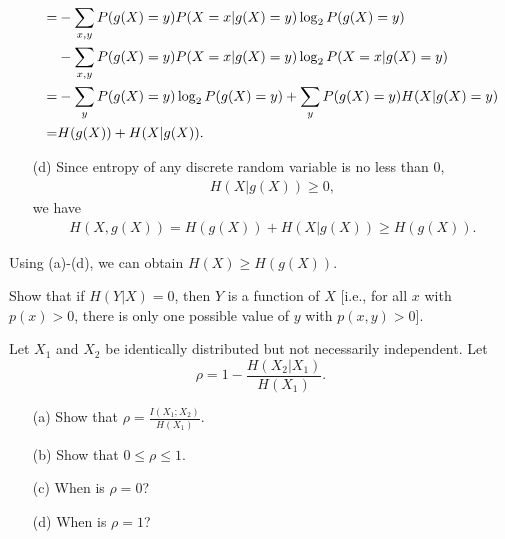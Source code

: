\documentclass{assignment}
\begin{document}
\begin{pf}
\begin{itemize}
\begin{align}
            \notag=&-\sum_{x,y}P(g(X)=y)P(X=x\vert g(X)=y)\log_2P(g(X)=y)\\
            \notag&-\sum_{x,y}P(g(X)=y)P(X=x\vert g(X)=y)\log_2P(X=x\vert g(X)=y)\\
            \notag=&-\sum_yP(g(X)=y)\log_2P(g(X)=y)+\sum_yP(g(X)=y)H(X\vert g(X)=y)\\
            \notag=&H(g(X))+H(X\vert g(X)).
        \end{align}
        \item[(d)] Since entropy of any discrete random variable is no less than $0$,
        \begin{align}
            H(X\vert g(X))\geq 0,
        \end{align}
        we have
        \begin{align}
            H(X,g(X))=H(g(X))+H(X\vert g(X))\geq H(g(X)).
        \end{align}
    \end{itemize}
    Using (a)-(d), we can obtain $H(X)\geq H(g(X))$.
\end{pf}

\begin{prob}
    Show that if $H(Y\vert X)=0$, then $Y$ is a function of $X$ [i.e., for all $x$ with $p(x)>0$, there is only one possible value of $y$ with $p(x,y)>0$].
\end{prob}
\begin{sol}
\end{sol}

\begin{prob}
    Let $X_1$ and $X_2$ be identically distributed but not necessarily independent. Let
    \[
        \rho=1-\frac{H(X_2\vert X_1)}{H(X_1)}.
    \]
    \begin{itemize}
        \item[(a)] Show that $\rho=\frac{I(X_1;X_2)}{H(X_1)}$.
        \item[(b)] Show that $0\leq\rho\leq 1$.
        \item[(c)] When is $\rho=0$?
        \item[(d)] When is $\rho=1$?
    \end{itemize}
\end{prob}
\begin{sol}
\end{sol}
\end{document}
